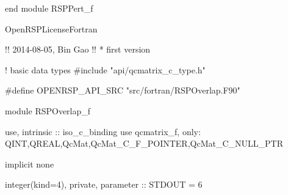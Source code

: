 end module RSPPert_f

\nwendcode{}\endmoddef
\LA{}OpenRSPLicenseFortran~{\nwtagstyle{}}\RA{}

!!  2014-08-05, Bin Gao
!!  * first version

! basic data types
#include "api/qcmatrix_c_type.h"

#define OPENRSP_API_SRC "src/fortran/RSPOverlap.F90"

module RSPOverlap_f

    use, intrinsic :: iso_c_binding
    use qcmatrix_f, only: QINT,QREAL,QcMat,QcMat_C_F_POINTER,QcMat_C_NULL_PTR

    implicit none

    integer(kind=4), private, parameter :: STDOUT = 6


